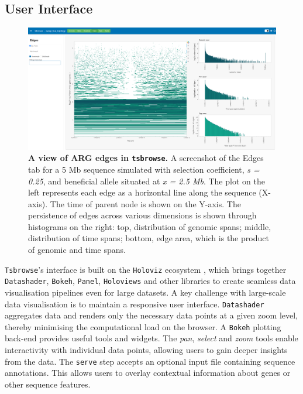 \documentclass[unnumsec,webpdf,contemporary,large,namedate]{oup-authoring-template}%
\begin{document}
\subsection{User Interface}
\label{subsec:User_Interface}
\begin{figure}
    \centering
    \includegraphics[width=0.95\linewidth]{manuscript/figures/MainFig2.png}
    \caption{\textbf{A view of ARG edges in \texttt{tsbrowse}.}
    A screenshot of the Edges tab for a 5 Mb sequence simulated with selection coefficient, \textit{s = 0.25}, and beneficial allele situated at \textit{x = 2.5 Mb}. The plot on the left represents each edge as a horizontal line along the sequence (X-axis). The time of parent node is shown on the Y-axis. The persistence of edges across various dimensions is shown through histograms on the right: top, distribution of genomic spans; middle, distribution of time spans; bottom, edge area, which is the product of genomic and time spans.} 
    \label{fig:Figure_2}
\end{figure}

\texttt{Tsbrowse}'s interface is built on the \texttt{Holoviz} ecosystem \citep{Holoviz}, which brings together \texttt{Datashader}, \texttt{Bokeh}, \texttt{Panel}, \texttt{Holoviews} and other libraries to create seamless data visualisation pipelines even for large datasets. A key challenge with large-scale data visualisation is to maintain a responsive user interface. \texttt{Datashader} aggregates data and renders only the necessary data points at a given zoom level, thereby minimising the computational load on the browser. A \texttt{Bokeh} plotting back-end provides useful tools and widgets. The \textit{pan}, \textit{select} and \textit{zoom} tools enable interactivity with individual data points, allowing users to gain deeper insights from the data. The \texttt{serve} step accepts an optional input file containing sequence annotations. This allows users to overlay contextual information about genes or other sequence features. 
\end{document}

